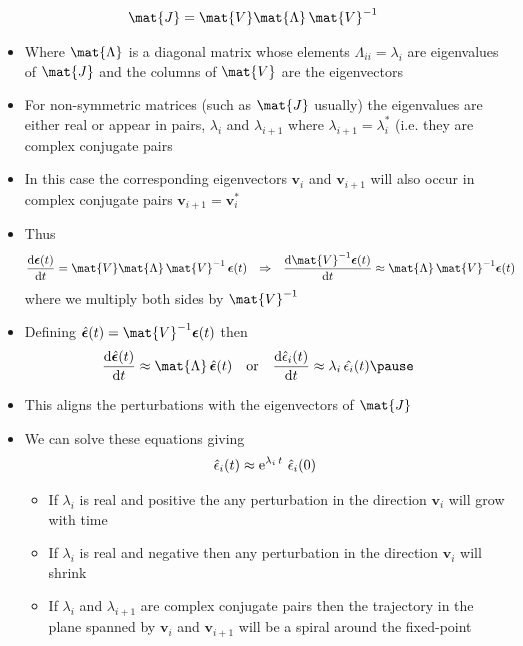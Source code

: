 \documentclass[11pt]{article}
\newcommand{\e}[1]{{\rm e}^{#1}}
\newcommand{\dd}{\mathrm{d}}
\begin{document}
\begin{itemize}
\begin{align*}
  \mat{J} = \mat{V} \mat{\Lambda}\,\mat{V}^{-1}
\end{align*}
\begin{itemize}
\item Where \(\mat{\Lambda}\) is a diagonal matrix whose elements
\(\Lambda_{ii}=\lambda_i\) are eigenvalues of \(\mat{J}\) and the
columns of \(\mat{V}\) are the eigenvectors
\item For non-symmetric matrices (such as \(\mat{J}\) usually) the eigenvalues
are either real or appear in pairs, \(\lambda_i\) and
\(\lambda_{i+1}\) where \(\lambda_{i+1} = \lambda_i^{*}\) (i.e. they
are complex conjugate pairs
\item In this case the corresponding eigenvectors \(\bm{v}_i\) and
\(\bm{v}_{i+1}\) will also occur in complex conjugate pairs
\(\bm{v}_{i+1}=\bm{v}_i^{*}\)
\item Thus
\begin{align*}
\frac{\dd \bm{\epsilon}(t)}{\dd t}
 &= \mat{V} \mat{\Lambda}\,\mat{V}^{-1}\, \bm{\epsilon}(t)
 &\Rightarrow&&
 \frac{\dd \mat{V}^{-1}\bm{\epsilon}(t)}{\dd t} 
 &\approx \mat{\Lambda}\, \mat{V}^{-1}\bm{\epsilon}(t)
\end{align*}
where we multiply both sides by \(\mat{V}^{-1}\)
\item Defining \(\hat{\bm{\epsilon}}(t) = \mat{V}^{-1}\bm{\epsilon}(t)\) then
\begin{align*}
 \frac{\dd \hat{\bm{\epsilon}}(t)}{\dd t} 
  &\approx \mat{\Lambda}\, \hat{\bm{\epsilon}}(t) & &\text{or} &
  \frac{\dd \hat{\epsilon}_i(t)}{\dd t} 
  &\approx \lambda_i\, \hat{\epsilon_i}(t)\pause
\end{align*}
\item This aligns the perturbations with the eigenvectors of \(\mat{J}\)
\item We can solve these equations giving
\[ \hat{\epsilon}_i(t) \approx \e{\lambda_i\,t}\,  \,\hat{\epsilon}_i(0) \]
\begin{itemize}
\item If \(\lambda_i\) is real and positive the any
perturbation in the direction \(\bm{v}_i\) will grow with time
\item If \(\lambda_i\) is real and negative then any
perturbation in the direction \(\bm{v}_i\) will shrink
\item If \(\lambda_i\) and \(\lambda_{i+1}\) are complex conjugate
pairs then the  trajectory in the plane spanned by \(\bm{v}_i\)
and \(\bm{v}_{i+1}\) will be a spiral around the fixed-point
\begin{itemize}

\end{itemize}
\end{itemize}
\end{itemize}
\end{itemize}
\end{document}
